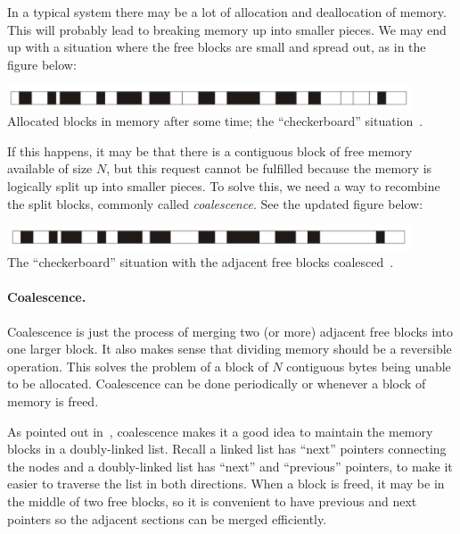 In a typical system there may be a lot of allocation and deallocation of memory. This will probably lead to breaking memory up into smaller pieces. We may end up with a situation where the free blocks are small and spread out, as in the figure below: 

\begin{center}
\includegraphics[width=0.9\textwidth]{images/checkerboard.png}\\
Allocated blocks in memory after some time; the ``checkerboard'' situation~\cite{mte241}.
\end{center}

If this happens, it may be that there is a contiguous block of free memory available of size $N$, but this request cannot be fulfilled because the memory is logically split up into smaller pieces. To solve this, we need a way to recombine the split blocks, commonly called \textit{coalescence}. See the updated figure below:

\begin{center}
\includegraphics[width=0.9\textwidth]{images/checkerboard-coalesced.png}\\
The ``checkerboard'' situation with the adjacent free blocks coalesced~\cite{mte241}.
\end{center}

\paragraph{Coalescence.} Coalescence is just the process of merging two (or more) adjacent free blocks into one larger block. It also makes sense that dividing memory should be a reversible operation. This solves the problem of a block of $N$ contiguous bytes being unable to be allocated. Coalescence can be done periodically or whenever a block of memory is freed.

As pointed out in~\cite{mte241}, coalescence makes it a good idea to maintain the memory blocks in a doubly-linked list. Recall a linked list has ``next'' pointers connecting the nodes and a doubly-linked list has ``next'' and ``previous'' pointers, to make it easier to traverse the list in both directions. When a block is freed, it may be in the middle of two free blocks, so it is convenient to have previous and next pointers so the adjacent sections can be merged efficiently.

